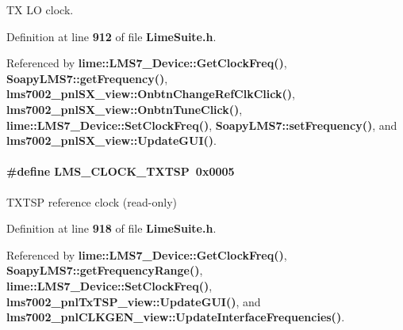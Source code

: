 TX LO clock. 



Definition at line {\bf 912} of file {\bf Lime\+Suite.\+h}.



Referenced by {\bf lime\+::\+L\+M\+S7\+\_\+\+Device\+::\+Get\+Clock\+Freq()}, {\bf Soapy\+L\+M\+S7\+::get\+Frequency()}, {\bf lms7002\+\_\+pnl\+S\+X\+\_\+view\+::\+Onbtn\+Change\+Ref\+Clk\+Click()}, {\bf lms7002\+\_\+pnl\+S\+X\+\_\+view\+::\+Onbtn\+Tune\+Click()}, {\bf lime\+::\+L\+M\+S7\+\_\+\+Device\+::\+Set\+Clock\+Freq()}, {\bf Soapy\+L\+M\+S7\+::set\+Frequency()}, and {\bf lms7002\+\_\+pnl\+S\+X\+\_\+view\+::\+Update\+G\+U\+I()}.

\paragraph[{L\+M\+S\+\_\+\+C\+L\+O\+C\+K\+\_\+\+T\+X\+T\+SP}]{\setlength{\rightskip}{0pt plus 5cm}\#define L\+M\+S\+\_\+\+C\+L\+O\+C\+K\+\_\+\+T\+X\+T\+SP~0x0005}\label{group__LMS__CLOCK__ID_ga1b52330283adbc22c63d18497ac7226a}


T\+X\+T\+SP reference clock (read-\/only) 



Definition at line {\bf 918} of file {\bf Lime\+Suite.\+h}.



Referenced by {\bf lime\+::\+L\+M\+S7\+\_\+\+Device\+::\+Get\+Clock\+Freq()}, {\bf Soapy\+L\+M\+S7\+::get\+Frequency\+Range()}, {\bf lime\+::\+L\+M\+S7\+\_\+\+Device\+::\+Set\+Clock\+Freq()}, {\bf lms7002\+\_\+pnl\+Tx\+T\+S\+P\+\_\+view\+::\+Update\+G\+U\+I()}, and {\bf lms7002\+\_\+pnl\+C\+L\+K\+G\+E\+N\+\_\+view\+::\+Update\+Interface\+Frequencies()}.


